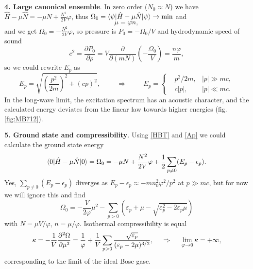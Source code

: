 \textbf{4. Large canonical ensemble}. In zero order ($N_0 \approx N$) we have $\hat{H} - \mu \hat{N} = - \mu N + \frac{N^2}{2V}\varphi$, thus $\Omega_0 = \bk{\psi}[\hat{H}- \mu \hat{N}]{\psi} \to \min$ and 
\begin{equation*}
	\mu = \varphi n,
\end{equation*}
and we get $\Omega_0 = - \frac{N^2}{2V} \varphi$, so pressure is $P_0 = - \Omega_0 /V$ and hydrodynamic speed of sound
\begin{equation*}
	c^2 = \frac{\partial P_0}{\partial \rho} = V \frac{\partial }{\partial (m N)} \left(- \frac{\Omega_0}{V}\right) = \frac{n \varphi}{m},
\end{equation*}
so we could  rewrite $E_p$ as
\begin{equation}
	E_p = \sqrt{\left(\frac{p^2}{2m}\right)^2 + (cp)^2},
	\hspace{1cm} \Rightarrow \hspace{1cm}
	E_p = \left\{\begin{aligned}
	    &p^2 / 2m, &|p| \gg mc, \\
	    &c |p| , &|p| \ll mc.
	\end{aligned}\right.
\end{equation}
In the long-wave limit, the excitation spectrum has an acoustic character, and the calculated energy deviates from the linear law towards higher energies (fig. \ref{fig:MB712}).


\textbf{5. Ground state and compressibility}. Using \eqref{HBT} and \eqref{Ap} we could calculate the ground state energy
\begin{equation}
	\bk{0}[\hat{H} - \mu \hat{N}]{0} = \Omega_0 = - \mu N + \frac{N^2}{2V}\varphi +\frac{1}{2} \sum_{p \neq 0} (E_p - \epsilon_p).
	\label{BECgs}
\end{equation}
Yes, $\sum_{p \neq 0} (E_p - \epsilon_p)$ diverges as $E_p - \epsilon_p \approx - m n_0^2 \varphi^2 / p^2$ at $p \gg mc$, but for now we will ignore this and find 
\begin{equation*}
	\Omega_0 = - \frac{V}{2\varphi} \mu^2 - \sum_{p > 0} \left(
		\varepsilon_p + \mu - \sqrt{\varepsilon_p^2 - 2 \varepsilon_p \mu} 
	\right)
\end{equation*}
with $N = \mu V  / \varphi$, $n = \mu / \varphi$. Isothermal compressibility is equal
\begin{equation*}
	\kappa = - \frac{1}{V} \frac{\partial^2 \Omega}{\partial \mu^2} = \frac{1}{\varphi} + \frac{1}{V} \sum_{p > 0} \frac{\sqrt{\varepsilon_p}}{(\varepsilon_p -2\mu)^{3/2}},
	\hspace{0.5cm} \Rightarrow \hspace{0.5cm}
	\lim_{\varphi \to 0} \kappa = +\infty,
\end{equation*}
corresponding to the limit of the ideal Bose gase. 


